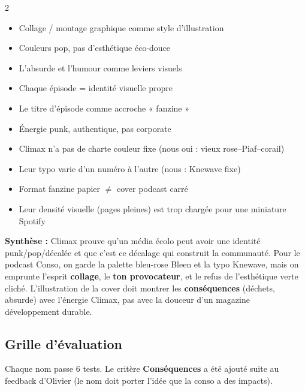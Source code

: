 \documentclass[a4paper,11pt]{article}
\newcommand{\doitem}[1]{\item[\textcolor{bleenGreen}{\ding{51}}] #1}
\newcommand{\dontitem}[1]{\item[\textcolor{consoPink}{\ding{55}}] #1}
\begin{document}
\begin{multicols}{2}
\begin{tcolorbox}[card, title={\color{bleenGreen!80!black}Transférable}, colframe=bleenGreen!30, borderline north={2pt}{0pt}{bleenGreen}]
\begin{itemize}[nosep, leftmargin=12pt]
  \doitem{Collage / montage graphique comme style d'illustration}
  \doitem{Couleurs pop, pas d'esthétique éco-douce}
  \doitem{L'absurde et l'humour comme leviers visuels}
  \doitem{Chaque épisode = identité visuelle propre}
  \doitem{Le titre d'épisode comme accroche « fanzine »}
  \doitem{Énergie punk, authentique, pas corporate}
\end{itemize}
\end{tcolorbox}

\begin{tcolorbox}[card, title={\color{consoPink}Points de divergence}, colframe=consoPink!30, borderline north={2pt}{0pt}{consoPink}]
\begin{itemize}[nosep, leftmargin=12pt]
  \dontitem{Climax n'a pas de charte couleur fixe (nous oui : vieux rose–Piaf–corail)}
  \dontitem{Leur typo varie d'un numéro à l'autre (nous : Knewave fixe)}
  \dontitem{Format fanzine papier $\neq$ cover podcast carré}
  \dontitem{Leur densité visuelle (pages pleines) est trop chargée pour une miniature Spotify}
\end{itemize}
\end{tcolorbox}
\end{multicols}

\begin{tcolorbox}[card, colframe=consoYellow!50]
\textbf{Synthèse :} Climax prouve qu'un média écolo peut avoir une identité punk/pop/décalée et que c'est ce décalage qui construit la communauté. Pour le podcast Conso, on garde la palette bleu-rose Bleen et la typo Knewave, mais on emprunte l'esprit \textbf{collage}, le \textbf{ton provocateur}, et le refus de l'esthétique verte cliché. L'illustration de la cover doit montrer les \textbf{conséquences} (déchets, absurde) avec l'énergie Climax, pas avec la douceur d'un magazine développement durable.
\end{tcolorbox}

\newpage

\subsection{Grille d'évaluation}

Chaque nom passe 6 tests. Le critère \textbf{Conséquences} a été ajouté suite au feedback d'Olivier (le nom doit porter l'idée que la conso a des impacts).
\end{document}
